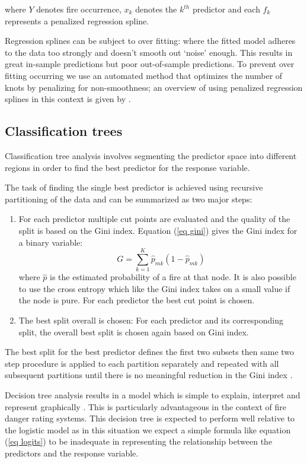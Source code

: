 \documentclass[11pt,a4paper]{article}
\begin{document}
where $Y$ denotes fire occurrence, $x_k$ denotes the $k^{th}$ predictor and each $f_k$ represents a penalized regression spline.

Regression splines can be subject to over fitting: where the fitted model adheres to the data too strongly and doesn't smooth out `noise' enough. This results in great in-sample predictions but poor out-of-sample predictions. To prevent over fitting occurring we use an automated method that optimizes the number of knots by penalizing for non-smoothness; an overview of using penalized regression splines in this context is given by \citet{wood02}. 

\subsection{Classification trees}

Classification tree analysis involves segmenting the predictor space into different regions in order to find the best predictor for the response variable. 

The task of finding the single best predictor is achieved using recursive partitioning of the data and can be summarized as two major steps:
\begin{enumerate}
	\item For each predictor multiple cut points are evaluated and the quality of the split is based on the Gini index. Equation (\ref{eq gini}) gives the Gini index for a binary variable:
	\begin{equation}
	\label{eq gini}
	G=\sum_{k=1}^{K} \hat{p}_{mk} (1-\hat{p}_{mk})
	\end{equation}
	where $\hat{p}$ is the estimated probability of a fire at that node. It is also possible to use the cross entropy \citep{james13} which like the Gini index takes on a small value if the node is pure. 
	For each predictor the best cut point is chosen. 
	\item The best split overall is chosen:  For each predictor and its corresponding split, the overall best split is chosen again based on Gini index. 
\end{enumerate}

The best split for the best predictor defines the first two subsets then same two step procedure is applied to each partition separately and repeated with all subsequent partitions until there is no meaningful reduction in the Gini index \citep{berk08,james13}. 

Decision tree analysis results in a model which is simple to explain, interpret and represent graphically \citep{james13}. This is particularly advantageous in the context of fire danger rating systems.
This decision tree is expected to perform well relative to the logistic model as in this situation we expect a simple formula like equation (\ref{eq logits}) to be inadequate in representing the relationship between the predictors and the response variable.  
\end{document}
